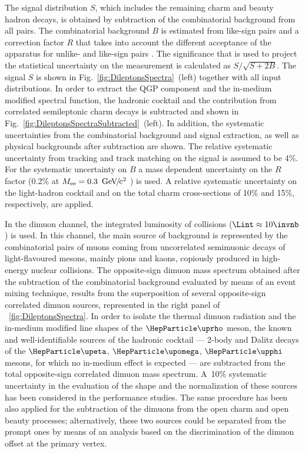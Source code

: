 \documentclass[../report.tex]{subfiles}
\begin{document}
The signal distribution $S$, which includes the remaining charm and beauty hadron decays, is obtained by subtraction of the combinatorial background from all \Pepem pairs. The combinatorial background $B$ is estimated from like-sign pairs and a correction factor $R$ that takes into account the different acceptance of the apparatus for unlike- and like-sign pairs \cite{Acharya:2018kkj,Acharya:2018ohw,Acharya:2018nxm}. The significance that is used to project the statistical uncertainty on the measurement is calculated as $S/\sqrt{S+2B}$. The signal $S$ is shown in Fig.~\ref{fig:DileptonsSpectra}~(left) together with all input distributions. In order to extract the QGP component and the in-medium modified \PGr spectral function, the hadronic cocktail and the contribution from correlated semileptonic charm decays is subtracted and shown in Fig.~\ref{fig:DileptonsSpectraSubtracted}~(left). In addition, the systematic uncertainties from the combinatorial background and signal extraction, as well as physical backgrounds after subtraction are shown. The relative systematic uncertainty from tracking and track matching on the signal is assumed to be 4\%. For the systematic uncertainty on $B$ a mass dependent uncertainty on the $R$ factor (0.2\% at $M_{\rm ee}=\unit[0.3]{\UGeVcc}$ \cite{Acharya:2018kkj}) is used. A relative systematic uncertainty on the light-hadron cocktail and on the total charm cross-sections of 10\% and 15\%, respectively, are applied.

In the dimuon channel, the integrated luminosity of \PbPb{} collisions ($\Lint\approx 10 \invnb$) is used. In this channel, the main source of background is represented by the combinatorial pairs of muons coming from uncorrelated semimuonic decays of light-flavoured mesons, mainly pions and kaons, copiously produced in high-energy nuclear collisions. The opposite-sign dimuon mass spectrum obtained after the subtraction of the combinatorial background evaluated by means of an event mixing technique, results from the superposition of several opposite-sign correlated dimuon sources, represented in the right panel of \figurename~\ref{fig:DileptonsSpectra}. 
In order to isolate the thermal dimuon radiation and the in-medium modified line shapes of the $\PGr$ meson,
the known and well-identifiable sources of the hadronic cocktail --- 2-body and Dalitz decays of the $\PGh$, $\PGo$, $\PGf$ mesons, for which no in-medium effect is expected --- are subtracted from the total opposite-sign correlated dimuon mass spectrum. A~10\% systematic uncertainty in the evaluation of the shape and the normalization of these sources has been considered in the performance studies. The same procedure has been also applied for the subtraction of the dimuons from the open charm and open beauty processes; alternatively, these two sources could be separated from the prompt ones by means of an analysis based on the discrimination of the dimuon offset at the primary vertex.
\end{document}
